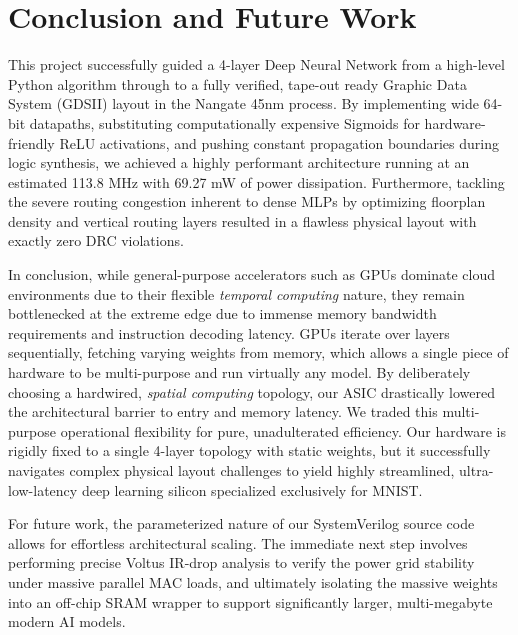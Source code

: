 \section{Conclusion and Future Work}
\label{sec:conclusion}

This project successfully guided a 4-layer Deep Neural Network from a high-level Python algorithm through to a fully verified, tape-out ready Graphic Data System (GDSII) layout in the Nangate 45nm process. By implementing wide 64-bit datapaths, substituting computationally expensive Sigmoids for hardware-friendly ReLU activations, and pushing constant propagation boundaries during logic synthesis, we achieved a highly performant architecture running at an estimated 113.8 MHz with 69.27 mW of power dissipation. Furthermore, tackling the severe routing congestion inherent to dense MLPs by optimizing floorplan density and vertical routing layers resulted in a flawless physical layout with exactly zero DRC violations.

In conclusion, while general-purpose accelerators such as GPUs dominate cloud environments due to their flexible \textit{temporal computing} nature, they remain bottlenecked at the extreme edge due to immense memory bandwidth requirements and instruction decoding latency. GPUs iterate over layers sequentially, fetching varying weights from memory, which allows a single piece of hardware to be multi-purpose and run virtually any model. By deliberately choosing a hardwired, \textit{spatial computing} topology, our ASIC drastically lowered the architectural barrier to entry and memory latency. We traded this multi-purpose operational flexibility for pure, unadulterated efficiency. Our hardware is rigidly fixed to a single 4-layer topology with static weights, but it successfully navigates complex physical layout challenges to yield highly streamlined, ultra-low-latency deep learning silicon specialized exclusively for MNIST.

For future work, the parameterized nature of our SystemVerilog source code allows for effortless architectural scaling. The immediate next step involves performing precise Voltus IR-drop analysis to verify the power grid stability under massive parallel MAC loads, and ultimately isolating the massive weights into an off-chip SRAM wrapper to support significantly larger, multi-megabyte modern AI models.


